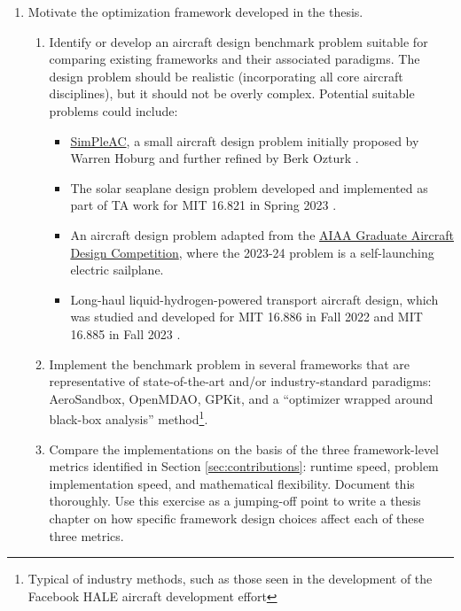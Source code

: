 \documentclass[12pt,vi,twoside]{article}
\begin{document}
    \begin{enumerate}
        \item Motivate the optimization framework developed in the thesis.
        \begin{enumerate}
            \item Identify or develop an aircraft design benchmark problem suitable for comparing existing frameworks and their associated paradigms. The design problem should be realistic (incorporating all core aircraft disciplines), but it should not be overly complex. Potential suitable problems could include:
            \begin{itemize}[noitemsep]
                \item \href{https://github.com/peterdsharpe/AeroSandbox/blob/master/tutorial/02%20-%20Design%20Optimization/03%20-%20Aircraft%20Design%20-%20SimPleAC.ipynb}{SimPleAC}, a small aircraft design problem initially proposed by Warren Hoburg \cite{hoburg_geometric_2014} and further refined by Berk Ozturk \cite{ozturk_conceptual_2018}.
                \item The solar seaplane design problem developed and implemented as part of TA work for MIT 16.821 in Spring 2023 \cite{solar-seaplane}.
                \item An aircraft design problem adapted from the \href{https://www.aiaa.org/get-involved/students-educators/Design-Competitions}{AIAA Graduate Aircraft Design Competition}, where the 2023-24 problem is a self-launching electric sailplane.
                \item Long-haul liquid-hydrogen-powered transport aircraft design, which was studied and developed for MIT 16.886 in Fall 2022 and MIT 16.885 in Fall 2023 \cite{gaubatz_estimating_2023, transport_aircraft}.
            \end{itemize}
            \item Implement the benchmark problem in several frameworks that are representative of state-of-the-art and/or industry-standard paradigms: AeroSandbox, OpenMDAO, GPKit, and a ``optimizer wrapped around black-box analysis'' method\footnote{Typical of industry methods, such as those seen in the development of the Facebook HALE aircraft development effort\cite{fbhale}}.
            \item Compare the implementations on the basis of the three framework-level metrics identified in Section \ref{sec:contributions}: runtime speed, problem implementation speed, and mathematical flexibility. Document this thoroughly. Use this exercise as a jumping-off point to write a thesis chapter on how specific framework design choices affect each of these three metrics.

\end{enumerate}
\end{enumerate}
\end{document}
